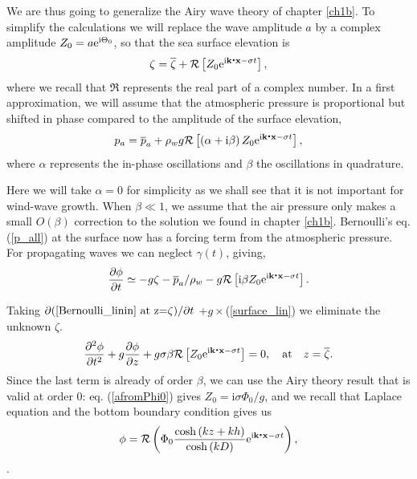 We are thus going to generalize the Airy wave theory of chapter \ref{ch1b}. To simplify the calculations we will replace the wave amplitude $a$ by a complex amplitude  $Z_0=a \mathrm{e}^{\mathrm{i} \Theta_0}$, so that the sea surface elevation is 
\begin{equation}
    \zeta= \overline{\zeta} + {\cal R} \left[ Z_0 \mathrm{e}^{\mathrm{i}{\mathbf k}\mbox{\boldmath $\cdot$}{\mathbf x} - \sigma t} \right],\label{polzetain}
\end{equation}
where we recall that $ \Re$ represents the real part of a complex number. In a first approximation, we will assume that the atmospheric pressure is proportional but shifted in phase compared to the amplitude of the surface elevation, 
\begin{equation}
 p_a= \overline{p}_a + \rho_w g {\cal R} \left[ \left( \alpha + {\mathrm i}\beta\right)   Z_0 \mathrm{e}^{\mathrm{i}{\mathbf k}\mbox{\boldmath $\cdot$}{\mathbf x} - \sigma t} \right], \label{wave_induced_pa}
\end{equation}
where $\alpha$ represents the in-phase oscillations and $\beta$ the oscillations in quadrature. 

Here we will take $\alpha=0$ for simplicity as we shall see that it is not important for wind-wave growth. 
When $\beta \ll 1$, we assume that the air pressure only makes a small $O(\beta)$ correction to the solution we found in  chapter \ref{ch1b}. 
Bernoulli's eq. (\ref{p_all}) at the surface now has a forcing term from the atmospheric pressure. For propagating waves we can neglect $\gamma(t)$, giving, 
\begin{equation}
    \frac{\partial \phi}{\partial t} \simeq 
       - g \zeta - \overline{p}_a/\rho_w  - g {\cal R} \left[{\mathrm i}\beta   Z_0 \mathrm{e}^{\mathrm{i}{\mathbf k}\mbox{\boldmath $\cdot$}{\mathbf x} - \sigma t} \right].\label{Bernoulli_linin}
\end{equation}

Taking  $\partial (\ref{Bernoulli_linin} \textrm{~at z=}\zeta)/\partial t $
+$g\times$(\ref{surface_lin}) we eliminate the unknown $\zeta$. 
\begin{equation}
  \frac{\partial^2{\phi}}{\partial{t^2}}+g\frac{\partial\phi}{\partial z} + g \sigma \beta   {\cal R} \left[   Z_0 \mathrm{e}^{\mathrm{i}{\mathbf k}\mbox{\boldmath $\cdot$}{\mathbf x} - \sigma t} \right] =0, \quad \mbox{at}
\quad  z=\overline{\zeta}. \label{surface 1in}
\end{equation}
Since the last term is already of order $\beta$, we can use the Airy theory result that is valid at order 0: eq. (\ref{afromPhi0}) gives   $Z_0={\mathrm i}{\sigma}\Phi_{0}/g$, and we recall that Laplace equation and the bottom boundary condition gives us 
\begin{equation}
    \phi={\cal R} \left( \Phi_0
    \frac{\cosh\left(kz+kh\right)}{\cosh\left(kD\right)}
     \mathrm{e}^{\mathrm{i}{\mathbf k}\mbox{\boldmath $\cdot$}{\mathbf x} - \sigma t} \right),
    \label{phi1recall}
\end{equation}.

